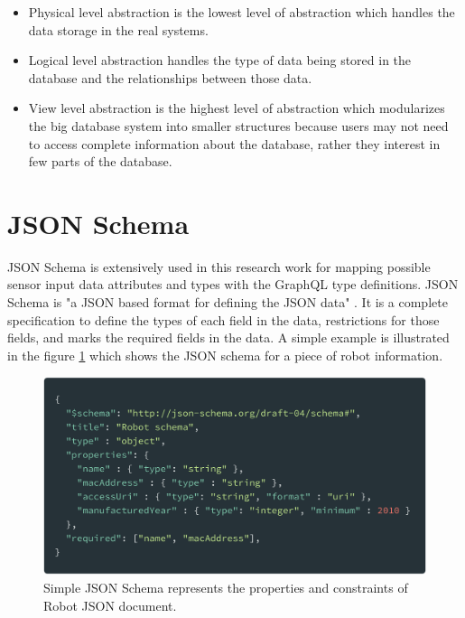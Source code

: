 	\begin{itemize}
		\item Physical level abstraction is the lowest level of abstraction which handles the data storage in the real systems. 
		\item Logical level abstraction handles the type of data being stored in the database and the relationships between those data.
		\item View level abstraction is the highest level of abstraction which modularizes the big database system into smaller structures because users may not need to access complete information about the database, rather they interest in few parts of the database. 		
	\end{itemize}

 	\section{JSON Schema} \label{sec:json_schema}
	
	JSON Schema is extensively used in this research work for mapping possible sensor input data attributes and types with the GraphQL type definitions. JSON Schema is "a JSON based format for defining the JSON data" \cite{misc13}. It is a complete specification to define the types of each field in the data, restrictions for those fields,  and marks the required fields in the data. A simple example is illustrated in the figure \ref{fig:json_schema} which shows the JSON schema for a piece of robot information. 
	
	\begin{figure}[!htbp] 
		\begin{center}
			\includegraphics[scale=0.1]{./images/png/json_schema}	
			\caption{Simple JSON Schema represents the properties and constraints of Robot JSON document.}	
			\label{fig:json_schema}	
		\end{center}
	\end{figure}
	
